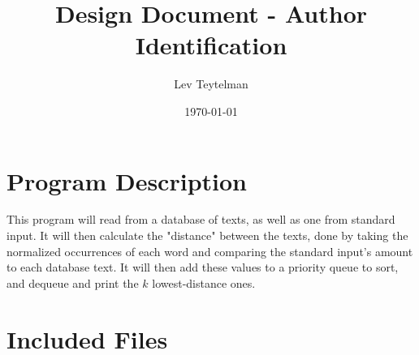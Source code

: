 \documentclass[12pt]{article}
\title{Design Document - Author Identification}
\author{Lev Teytelman}
\date{\today}
\begin{document}
\maketitle
\section{Program Description}

This program will read from a database of texts, as well as one from standard input. It will then calculate the "distance" between the texts, done by taking the normalized occurrences of each word and comparing the standard input's amount to each database text. It will then add these values to a priority queue to sort, and dequeue and print the $k$ lowest-distance ones.
\section{Included Files}
\end{document}
